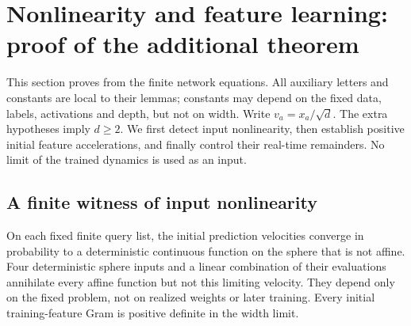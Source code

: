 \section{Nonlinearity and feature learning: proof of the additional theorem}
\label{sec:nonlinear-learning-proof}

This section proves  from the finite network
equations. All auxiliary letters and constants are local to their lemmas;
constants may depend on the fixed data, labels, activations and depth, but
not on width. Write $v_a=x_a/\sqrt d$. The extra hypotheses imply $d\ge2$.
We first detect input nonlinearity, then establish positive initial feature
accelerations, and finally control their real-time remainders. No limit of
the trained dynamics is used as an input.

\subsection{A finite witness of input nonlinearity}

\begin{lemma}
\label{fl:input-lemma}
On each fixed finite query list, the initial prediction velocities converge
in probability to a deterministic continuous function on the sphere that is
not affine. Four deterministic sphere inputs and a linear combination of
their evaluations annihilate every affine function but not this limiting
velocity. They depend only on the fixed problem, not on realized weights or
later training. Every initial training-feature Gram is positive definite in
the width limit.
\end{lemma}

